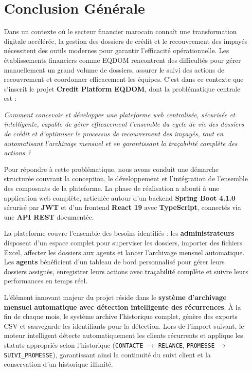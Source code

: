 \section*{Conclusion Générale}

Dans un contexte où le secteur financier marocain connaît une transformation digitale accélérée, la gestion des dossiers de crédit et le recouvrement des impayés nécessitent des outils modernes pour garantir l'efficacité opérationnelle. Les établissements financiers comme EQDOM rencontrent des difficultés pour gérer manuellement un grand volume de dossiers, assurer le suivi des actions de recouvrement et coordonner efficacement les équipes. C'est dans ce contexte que s'inscrit le projet \textbf{Credit Platform EQDOM}, dont la problématique centrale est :

\vspace{0.5cm}

\begin{center}
\textit{Comment concevoir et développer une plateforme web centralisée, sécurisée et intelligente, capable de gérer efficacement l'ensemble du cycle de vie des dossiers de crédit et d'optimiser le processus de recouvrement des impayés, tout en automatisant l'archivage mensuel et en garantissant la traçabilité complète des actions ?}
\end{center}

\vspace{0.5cm}

Pour répondre à cette problématique, nous avons conduit une démarche structurée couvrant la conception, le développement et l'intégration de l'ensemble des composants de la plateforme. La phase de réalisation a abouti à une application web complète, articulée autour d'un backend \textbf{Spring Boot 4.1.0} sécurisé par \textbf{JWT} et d'un frontend \textbf{React 19} avec \textbf{TypeScript}, connectés via une \textbf{API REST} documentée.

La plateforme couvre l'ensemble des besoins identifiés : les \textbf{administrateurs} disposent d'un espace complet pour superviser les dossiers, importer des fichiers Excel, affecter les dossiers aux agents et lancer l'archivage mensuel automatique. Les \textbf{agents} bénéficient d'un tableau de bord personnalisé pour gérer leurs dossiers assignés, enregistrer leurs actions avec traçabilité complète et suivre leurs performances en temps réel.

L'élément innovant majeur du projet réside dans le \textbf{système d'archivage mensuel automatique avec détection intelligente des récurrences}. À la fin de chaque mois, le système archive l'historique complet, génère des exports CSV et sauvegarde les identifiants pour la détection. Lors de l'import suivant, le moteur intelligent détecte automatiquement les clients récurrents et applique les statuts appropriés selon l'historique (\texttt{CONTACTE} $\rightarrow$ \texttt{RELANCE}, \texttt{PROMESSE} $\rightarrow$ \texttt{SUIVI\_PROMESSE}), garantissant ainsi la continuité du suivi client et la conservation d'un historique illimité.

